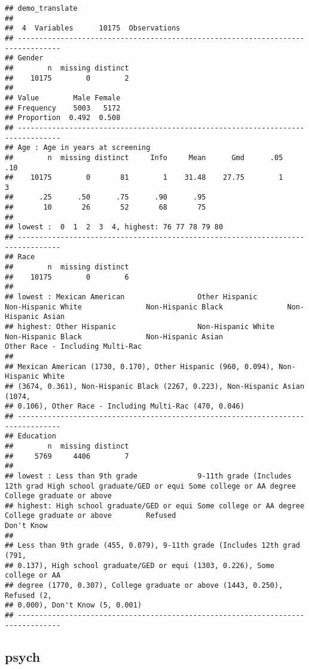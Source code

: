 \documentclass[
]{book}
\begin{document}
\begin{verbatim}
## demo_translate
##
##  4  Variables      10175  Observations
## --------------------------------------------------------------------------------
## Gender
##        n  missing distinct
##    10175        0        2
##
## Value        Male Female
## Frequency    5003   5172
## Proportion  0.492  0.508
## --------------------------------------------------------------------------------
## Age : Age in years at screening
##        n  missing distinct     Info     Mean      Gmd      .05      .10
##    10175        0       81        1    31.48    27.75        1        3
##      .25      .50      .75      .90      .95
##       10       26       52       68       75
##
## lowest :  0  1  2  3  4, highest: 76 77 78 79 80
## --------------------------------------------------------------------------------
## Race
##        n  missing distinct
##    10175        0        6
##
## lowest : Mexican American                 Other Hispanic                   Non-Hispanic White               Non-Hispanic Black               Non-Hispanic Asian
## highest: Other Hispanic                   Non-Hispanic White               Non-Hispanic Black               Non-Hispanic Asian               Other Race - Including Multi-Rac
##
## Mexican American (1730, 0.170), Other Hispanic (960, 0.094), Non-Hispanic White
## (3674, 0.361), Non-Hispanic Black (2267, 0.223), Non-Hispanic Asian (1074,
## 0.106), Other Race - Including Multi-Rac (470, 0.046)
## --------------------------------------------------------------------------------
## Education
##        n  missing distinct
##     5769     4406        7
##
## lowest : Less than 9th grade              9-11th grade (Includes 12th grad High school graduate/GED or equi Some college or AA degree        College graduate or above
## highest: High school graduate/GED or equi Some college or AA degree        College graduate or above        Refused                          Don't Know
##
## Less than 9th grade (455, 0.079), 9-11th grade (Includes 12th grad (791,
## 0.137), High school graduate/GED or equi (1303, 0.226), Some college or AA
## degree (1770, 0.307), College graduate or above (1443, 0.250), Refused (2,
## 0.000), Don't Know (5, 0.001)
## --------------------------------------------------------------------------------
\end{verbatim}

\hypertarget{psych}{%
\subsection{psych}\label{psych}}
\end{document}
